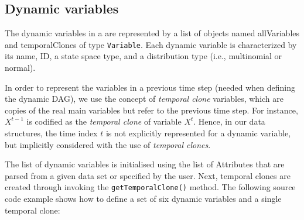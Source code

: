 \subsection{Dynamic variables}

The dynamic variables in a  are represented by a list of objects named allVariables and temporalClones of type \texttt{Variable}. Each dynamic variable is characterized by its name, ID, a state space type, and a distribution type (i.e., multinomial or normal). 

In order to represent the variables in a previous time step (needed when defining the dynamic DAG), we use the concept of \textit{temporal clone} variables, which are copies of the real main variables but refer to the previous time step. For instance, $X^{t-1}$ is codified as the \textit{temporal clone} of variable $X^t$. Hence, in our data structures, the time index $t$ is not explicitly represented for a dynamic variable, but implicitly considered with the use of \textit{temporal clones}.

The list of dynamic variables is initialised using the list of Attributes that are parsed from a given data set or specified by the user. Next, temporal clones are created through invoking the \texttt{getTemporalClone()} method. The following source code example shows how to define a set of six dynamic variables and a single temporal clone:


